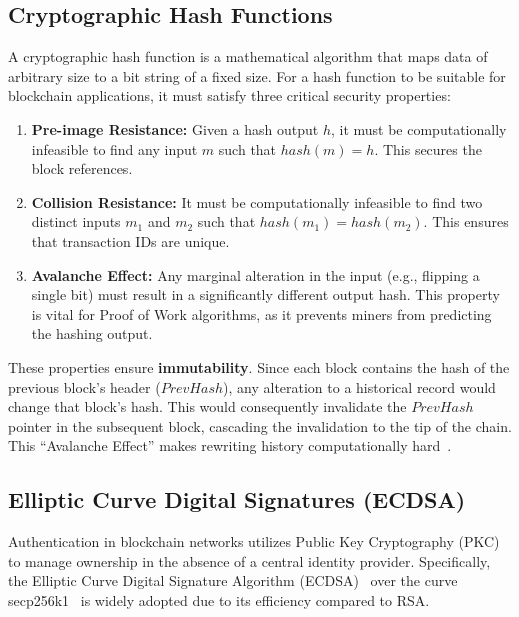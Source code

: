 \subsection{Cryptographic Hash Functions}
A cryptographic hash function is a mathematical algorithm that maps data of arbitrary size to a bit string of a fixed size. For a hash function to be suitable for blockchain applications, it must satisfy three critical security properties:
\begin{enumerate}
    \item \textbf{Pre-image Resistance:} Given a hash output $h$, it must be computationally infeasible to find any input $m$ such that $hash(m) = h$. This secures the block references.
    \item \textbf{Collision Resistance:} It must be computationally infeasible to find two distinct inputs $m_1$ and $m_2$ such that $hash(m_1) = hash(m_2)$. This ensures that transaction IDs are unique.
    \item \textbf{Avalanche Effect:} Any marginal alteration in the input (e.g., flipping a single bit) must result in a significantly different output hash. This property is vital for Proof of Work algorithms, as it prevents miners from predicting the hashing output.
\end{enumerate}


These properties ensure \textbf{immutability}. Since each block contains the hash of the previous block's header ($PrevHash$), any alteration to a historical record would change that block's hash. This would consequently invalidate the $PrevHash$ pointer in the subsequent block, cascading the invalidation to the tip of the chain. This \enquote{Avalanche Effect} makes rewriting history computationally hard~\cite{katz2014introductionAvalnche}.


\subsection{Elliptic Curve Digital Signatures (ECDSA)}
Authentication in blockchain networks utilizes Public Key Cryptography (PKC) to manage ownership in the absence of a central identity provider. Specifically, the Elliptic Curve Digital Signature Algorithm (ECDSA)~\cite{johnson2001ecdsa} over the curve secp256k1~\cite{sinai2024quantumsecp256k1} is widely adopted due to its efficiency compared to RSA.

